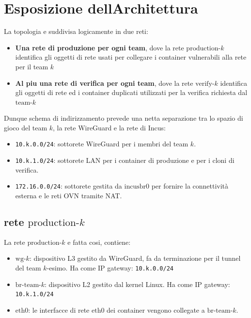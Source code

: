 \section{Esposizione
dell\textquotesingle Architettura}\label{esposizione-dellarchitettura}

La topologia e\textquotesingle{} suddivisa logicamente in due reti:

\begin{itemize}
\tightlist
\item
  \textbf{Una rete di produzione per ogni team}, dove la rete
  \(\text{production-}k\) identifica gli oggetti di rete usati per
  collegare i container vulnerabili alla rete per il team \(k\)
\item
  \textbf{Al piu\textquotesingle{} una rete di verifica per ogni team},
  dove la rete \(\text{verify-}k\) identifica gli oggetti di rete ed i
  container duplicati utilizzati per la verifica richiesta dal
  \(\text{team-}k\)
\end{itemize}

Dunque schema di indirizzamento prevede una netta separazione tra lo
spazio di gioco del team \(k\), la rete WireGuard e la rete di Incus:

\begin{itemize}
\tightlist
\item
  \passthrough{\lstinline!10.k.0.0/24!}: sottorete WireGuard per i
  membri del team \(k\).
\item
  \passthrough{\lstinline!10.k.1.0/24!}: sottorete LAN per i container
  di produzione e per i cloni di verifica.
\item
  \passthrough{\lstinline!172.16.0.0/24!}: sottorete gestita da
  \(\text{incusbr0}\) per fornire la connettività esterna e le reti OVN
  tramite NAT.
\end{itemize}

\subsection{\texorpdfstring{rete
\(\text{production-}k\)}{rete \textbackslash text\{production-\}k}}\label{rete-textproduction-k}

La rete \(\text{production-}k\) e\textquotesingle{} fatta cosi,
contiene:

\begin{itemize}
\tightlist
\item
  \(\text{wg-}k\): dispositivo L3 gestito da WireGuard, fa da
  terminazione per il tunnel del team \(k\)-esimo. Ha come IP gateway:
  \passthrough{\lstinline!10.k.0.0/24!}
\item
  \(\text{br-team-}k\): dispositivo L2 gestito dal kernel Linux. Ha come
  IP gateway: \passthrough{\lstinline!10.k.1.0/24!}
\item
  \(\text{eth0}\): le interfacce di rete \(\text{eth0}\) dei container
  vengono collegate a \(\text{br-team-}k\).
\end{itemize}

